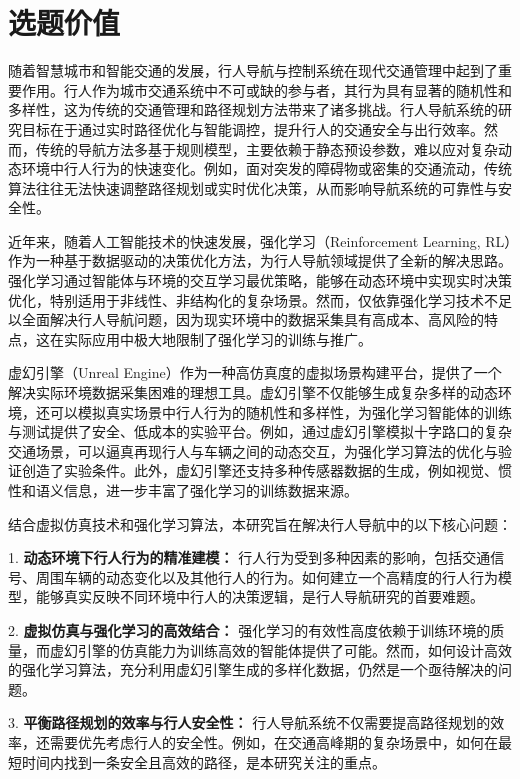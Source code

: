 \section*{选题价值}

随着智慧城市和智能交通的发展，行人导航与控制系统在现代交通管理中起到了重要作用。行人作为城市交通系统中不可或缺的参与者，其行为具有显著的随机性和多样性，这为传统的交通管理和路径规划方法带来了诸多挑战。行人导航系统的研究目标在于通过实时路径优化与智能调控，提升行人的交通安全与出行效率。然而，传统的导航方法多基于规则模型，主要依赖于静态预设参数，难以应对复杂动态环境中行人行为的快速变化。例如，面对突发的障碍物或密集的交通流动，传统算法往往无法快速调整路径规划或实时优化决策，从而影响导航系统的可靠性与安全性。

近年来，随着人工智能技术的快速发展，强化学习（Reinforcement Learning, RL）作为一种基于数据驱动的决策优化方法，为行人导航领域提供了全新的解决思路。强化学习通过智能体与环境的交互学习最优策略，能够在动态环境中实现实时决策优化，特别适用于非线性、非结构化的复杂场景。然而，仅依靠强化学习技术不足以全面解决行人导航问题，因为现实环境中的数据采集具有高成本、高风险的特点，这在实际应用中极大地限制了强化学习的训练与推广。

虚幻引擎（Unreal Engine）作为一种高仿真度的虚拟场景构建平台，提供了一个解决实际环境数据采集困难的理想工具。虚幻引擎不仅能够生成复杂多样的动态环境，还可以模拟真实场景中行人行为的随机性和多样性，为强化学习智能体的训练与测试提供了安全、低成本的实验平台。例如，通过虚幻引擎模拟十字路口的复杂交通场景，可以逼真再现行人与车辆之间的动态交互，为强化学习算法的优化与验证创造了实验条件。此外，虚幻引擎还支持多种传感器数据的生成，例如视觉、惯性和语义信息，进一步丰富了强化学习的训练数据来源。

结合虚拟仿真技术和强化学习算法，本研究旨在解决行人导航中的以下核心问题：

1. \textbf{ 动态环境下行人行为的精准建模：} 行人行为受到多种因素的影响，包括交通信号、周围车辆的动态变化以及其他行人的行为。如何建立一个高精度的行人行为模型，能够真实反映不同环境中行人的决策逻辑，是行人导航研究的首要难题。

2. \textbf{ 虚拟仿真与强化学习的高效结合：} 强化学习的有效性高度依赖于训练环境的质量，而虚幻引擎的仿真能力为训练高效的智能体提供了可能。然而，如何设计高效的强化学习算法，充分利用虚幻引擎生成的多样化数据，仍然是一个亟待解决的问题。

3. \textbf{ 平衡路径规划的效率与行人安全性：} 行人导航系统不仅需要提高路径规划的效率，还需要优先考虑行人的安全性。例如，在交通高峰期的复杂场景中，如何在最短时间内找到一条安全且高效的路径，是本研究关注的重点。

